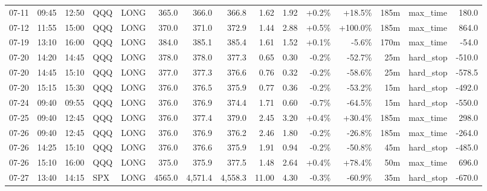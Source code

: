 \documentclass[11pt,a4paper,twoside]{article}
\begin{document}
\begin{landscape}
\begin{center}
\begin{longtable}{>{\color{txtmain}}l l l l l r r r r r r r r >{\color{txtmain}}l r}
07-11 & 09:45 & 12:50 & QQQ & LONG & 365.0 & 366.0 & 366.8 & 1.62 & 1.92 & \textcolor{wingreen}{+0.2\%} & \textcolor{wingreen}{+18.5\%} & 185m & max\_time & \textcolor{wingreen}{180.0} \\
07-12 & 11:55 & 15:00 & QQQ & LONG & 370.0 & 371.0 & 372.9 & 1.44 & 2.88 & \textcolor{wingreen}{+0.5\%} & \textcolor{wingreen}{+100.0\%} & 185m & max\_time & \textcolor{wingreen}{864.0} \\
07-19 & 13:10 & 16:00 & QQQ & LONG & 384.0 & 385.1 & 385.4 & 1.61 & 1.52 & \textcolor{wingreen}{+0.1\%} & \textcolor{lossred}{-5.6\%} & 170m & max\_time & \textcolor{lossred}{-54.0} \\
07-20 & 14:20 & 14:45 & QQQ & LONG & 378.0 & 378.0 & 377.3 & 0.65 & 0.30 & \textcolor{lossred}{-0.2\%} & \textcolor{lossred}{-52.7\%} & 25m & hard\_stop & \textcolor{lossred}{-510.0} \\
07-20 & 14:45 & 15:10 & QQQ & LONG & 377.0 & 377.3 & 376.6 & 0.76 & 0.32 & \textcolor{lossred}{-0.2\%} & \textcolor{lossred}{-58.6\%} & 25m & hard\_stop & \textcolor{lossred}{-578.5} \\
07-20 & 15:15 & 15:30 & QQQ & LONG & 376.0 & 376.5 & 375.9 & 0.77 & 0.36 & \textcolor{lossred}{-0.2\%} & \textcolor{lossred}{-53.2\%} & 15m & hard\_stop & \textcolor{lossred}{-492.0} \\
07-24 & 09:40 & 09:55 & QQQ & LONG & 376.0 & 376.9 & 374.4 & 1.71 & 0.60 & \textcolor{lossred}{-0.7\%} & \textcolor{lossred}{-64.5\%} & 15m & hard\_stop & \textcolor{lossred}{-550.0} \\
07-25 & 09:40 & 12:45 & QQQ & LONG & 376.0 & 377.4 & 379.0 & 2.45 & 3.20 & \textcolor{wingreen}{+0.4\%} & \textcolor{wingreen}{+30.4\%} & 185m & max\_time & \textcolor{wingreen}{298.0} \\
07-26 & 09:40 & 12:45 & QQQ & LONG & 376.0 & 376.9 & 376.2 & 2.46 & 1.80 & \textcolor{lossred}{-0.2\%} & \textcolor{lossred}{-26.8\%} & 185m & max\_time & \textcolor{lossred}{-264.0} \\
07-26 & 14:25 & 15:10 & QQQ & LONG & 376.0 & 376.6 & 375.9 & 1.91 & 0.94 & \textcolor{lossred}{-0.2\%} & \textcolor{lossred}{-50.8\%} & 45m & hard\_stop & \textcolor{lossred}{-485.0} \\
07-26 & 15:10 & 16:00 & QQQ & LONG & 375.0 & 375.9 & 377.5 & 1.48 & 2.64 & \textcolor{wingreen}{+0.4\%} & \textcolor{wingreen}{+78.4\%} & 50m & max\_time & \textcolor{wingreen}{696.0} \\
07-27 & 13:40 & 14:15 & SPX & LONG & 4565.0 & 4,571.4 & 4,558.3 & 11.00 & 4.30 & \textcolor{lossred}{-0.3\%} & \textcolor{lossred}{-60.9\%} & 35m & hard\_stop & \textcolor{lossred}{-670.0} \\

\end{longtable}
\end{center}
\end{landscape}
\end{document}
